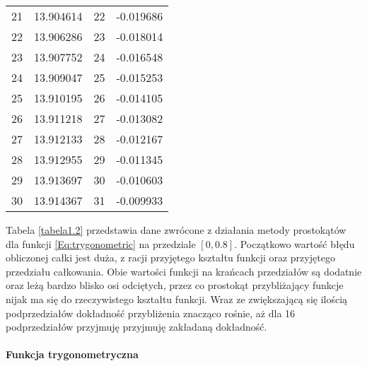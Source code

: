 \documentclass[12pt,twoside]{article}
\begin{document}
\begin{table}[H]
\begin{tabular}{lrrr}
21 &      13.904614 &      22 & -0.019686 \\
22 &      13.906286 &      23 & -0.018014 \\
23 &      13.907752 &      24 & -0.016548 \\
24 &      13.909047 &      25 & -0.015253 \\
25 &      13.910195 &      26 & -0.014105 \\
26 &      13.911218 &      27 & -0.013082 \\
27 &      13.912133 &      28 & -0.012167 \\
28 &      13.912955 &      29 & -0.011345 \\
29 &      13.913697 &      30 & -0.010603 \\
30 &      13.914367 &      31 & -0.009933 \\
\bottomrule
\end{tabular}
\end{table}


Tabela \eqref{tabela1.2} przedstawia dane zwrócone z działania metody prostokątów dla funkcji \eqref{Eq:trygonometric} na przedziale $[0,0.8]$.
Początkowo wartość błędu obliczonej całki jest duża, z racji przyjętego kształtu funkcji oraz przyjętego przedziału całkowania. Obie wartości funkcji na krańcach przedziałów są dodatnie oraz leżą bardzo blisko osi odciętych, przez co prostokąt przybliżający funkcje nijak ma się do rzeczywistego kształtu funkcji. Wraz ze zwiększającą się ilością podprzedziałów dokładność przybliżenia znacząco rośnie, aż dla 16 podprzedziałów przyjmuję przyjmuję zakładaną dokładność.


\paragraph{Funkcja trygonometryczna}\mbox{} \\
\end{document}
